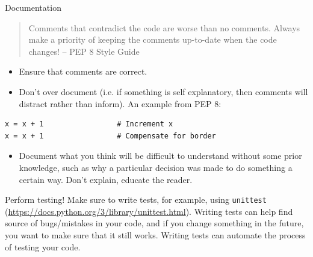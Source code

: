 \documentclass[10pt]{beamer}
\begin{document}
\begin{frame}[label={sec:org6c9098b},fragile]{Documentation}
 \begin{quote}
Comments that contradict the code are worse than no comments. Always make a priority
of keeping the comments up-to-date when the code changes! -- PEP 8 Style Guide
\end{quote}

\begin{itemize}
\item Ensure that comments are correct.
\item Don't over document (i.e. if something is self explanatory, then comments will
distract rather than inform). An example from PEP 8:
\end{itemize}

\begin{verbatim}
x = x + 1                 # Increment x
x = x + 1                 # Compensate for border
\end{verbatim}

\begin{itemize}
\item Document what you think will be difficult to understand without some prior knowledge,
such as why a particular decision was made to do something a certain way. Don't
explain, educate the reader.
\end{itemize}
\end{frame}

\begin{frame}[label={sec:orgee997d9},fragile]{Perform testing!}
 Make sure to write tests, for example, using \texttt{unittest}
(\url{https://docs.python.org/3/library/unittest.html}). Writing tests can help find source
of bugs/mistakes in your code, and if you change something in the future, you want to
make sure that it still works. Writing tests can automate the process of testing your
code.
\end{frame}
\end{document}
